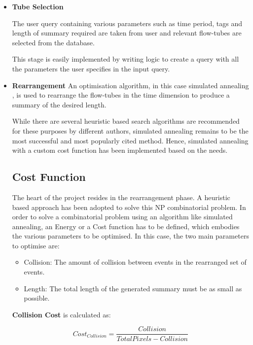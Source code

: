 \begin{itemize}

    \item \textbf{Tube Selection}

    The user query containing various parameters such as time period, tags and
    length of summary required are taken from user and relevant flow-tubes are
    selected from the database.

    This stage is easily implemented by writing logic to create a query with
    all the parameters the user specifies in the input query.

    \item \textbf{Rearrangement}
    An optimisation algorithm, in this case simulated annealing
    \cite{yao1995new}, is used to rearrange the flow-tubes in the time
    dimension to produce a summary of the desired length.

    While there are several heuristic based search algorithms are recommended
    for these purposes by different authors, simulated annealing remains to be
    the most successful and most popularly cited method. Hence, simulated
    annealing with a custom cost function has been implemented based on the
    needs.

    \subsection{Cost Function}
    The heart of the project resides in the rearrangement phase. A heuristic
    based approach has been adopted to solve this NP combinatorial problem.
    In order to solve a combinatorial problem using an algorithm like simulated
    annealing\cite{yao1995new}, an Energy or a Cost function has to be defined,
    which embodies the various parameters to be optimised. In this case, the
    two main parameters to optimise are:
    \begin{itemize}
        \item Collision: The amount of collision between events in the rearranged
        set of events.
        \item Length: The total length of the generated summary must be as small
        as possible.
    \end{itemize}
    \textbf{Collision Cost} is calculated as:

    \begin{equation}\label{eqn:collcost}
    Cost_{Collision} = \frac{Collision}{TotalPixels - Collision}
    \end{equation}


\end{itemize}
